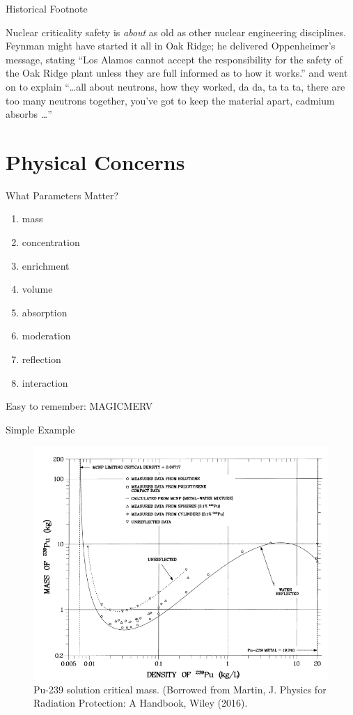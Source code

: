 \documentclass[10pt]{beamer}
\begin{document}
\begin{frame}{Historical Footnote}

Nuclear criticality safety is {\it about} as old as other nuclear engineering
disciplines.  Feynman might have started it all in Oak Ridge; he delivered
Oppenheimer's message, stating
\vfill
\textcolor{mitred}{``Los Alamos cannot accept the responsibility
for the safety of the Oak Ridge plant unless they are full informed as
to how it works.''}
\vfill
and went on to explain
\vfill
\textcolor{mitred}{``\ldots all about neutrons, how they worked, da da, ta ta ta,
there are too many neutrons together, you've got to keep the material
apart, cadmium absorbs \ldots''}


\end{frame}


\section{Physical Concerns}

\begin{frame}{What Parameters Matter?}

\begin{enumerate}
 \item mass
 \item concentration
 \item enrichment
 \item volume
 \item absorption
 \item moderation
 \item reflection
 \item interaction
\end{enumerate}
\vfill Easy to remember: MAGICMERV
\end{frame}

\begin{frame}{Simple Example}
  \begin{figure}
    \includegraphics[keepaspectratio, width = 3.2 in]{images/pu_critical_mass}
    \caption{Pu-239 solution critical mass. (Borrowed from Martin, J. {
             Physics for Radiation Protection: A Handbook}, Wiley (2016).}
  \end{figure}
\end{frame}
\end{document}
